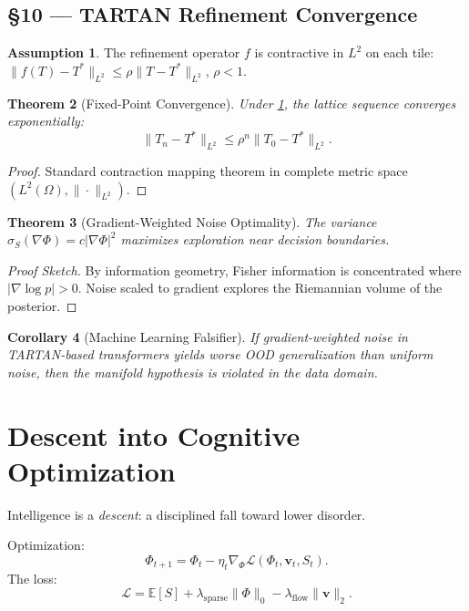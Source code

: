 \documentclass[11pt]{article}
\newtheorem{theorem}{Theorem}[section]
\newtheorem{corollary}[theorem]{Corollary}
\theoremstyle{definition}
\newtheorem{assumption}[theorem]{Assumption}
\theoremstyle{remark}
\newcommand{\vect}[1]{\bm{#1}}
\newcommand{\norm}[1]{\lVert #1\rVert}
\begin{document}
\subsection*{§10 — TARTAN Refinement Convergence}

\begin{assumption}
\label{ass:tartan}
The refinement operator $f$ is contractive in $L^2$ on each tile: $\norm{f(T) - T^*}_{L^2} \le \rho \norm{T - T^*}_{L^2}$, $\rho < 1$.
\end{assumption}

\begin{theorem}[Fixed-Point Convergence]
Under \cref{ass:tartan}, the lattice sequence converges exponentially:
\[
\norm{T_n - T^*}_{L^2} \le \rho^n \norm{T_0 - T^*}_{L^2}.
\]
\end{theorem}

\begin{proof}
Standard contraction mapping theorem in complete metric space $(L^2(\Omega),\|\cdot\|_{L^2})$.
\end{proof}

\begin{theorem}[Gradient-Weighted Noise Optimality]
The variance $\sigma_S(\nabla \Phi) = c |\nabla \Phi|^2$ maximizes exploration near decision boundaries.
\end{theorem}

\begin{proof}[Proof Sketch]
By information geometry, Fisher information is concentrated where $|\nabla \log p| > 0$. Noise scaled to gradient explores the Riemannian volume of the posterior.
\end{proof}

\begin{corollary}[Machine Learning Falsifier]
If gradient-weighted noise in TARTAN-based transformers yields worse OOD generalization than uniform noise, then the manifold hypothesis is violated in the data domain.
\end{corollary}

\section{Descent into Cognitive Optimization}
Intelligence is a \emph{descent}: a disciplined fall toward lower disorder.

Optimization:
\begin{equation}
\boxed{\Phi_{t+1}=\Phi_t - \eta_t \nabla_\Phi \mathcal{L}(\Phi_t,\vect{v}_t,S_t).}
\end{equation}
The loss:
\begin{equation}
\boxed{\mathcal{L}=\mathbb{E}[S] + \lambda_{\mathrm{sparse}}\|\Phi\|_0 - \lambda_{\mathrm{flow}}\|\vect{v}\|_2.}
\label{eq:clio_loss}
\end{equation}
\end{document}
